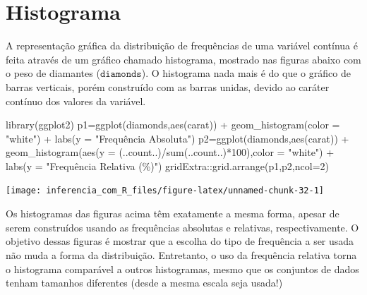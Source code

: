 \documentclass[
]{book}
\newenvironment{Shaded}{\begin{snugshade}}{\end{snugshade}}
\newcommand{\AttributeTok}[1]{\textcolor[rgb]{0.77,0.63,0.00}{#1}}
\newcommand{\DecValTok}[1]{\textcolor[rgb]{0.00,0.00,0.81}{#1}}
\newcommand{\FunctionTok}[1]{\textcolor[rgb]{0.00,0.00,0.00}{#1}}
\newcommand{\NormalTok}[1]{#1}
\newcommand{\OtherTok}[1]{\textcolor[rgb]{0.56,0.35,0.01}{#1}}
\newcommand{\SpecialCharTok}[1]{\textcolor[rgb]{0.00,0.00,0.00}{#1}}
\newcommand{\StringTok}[1]{\textcolor[rgb]{0.31,0.60,0.02}{#1}}
\begin{document}
\hypertarget{histograma}{%
\section{Histograma}\label{histograma}}

A representação gráfica da distribuição de frequências de uma variável contínua é feita através de um gráfico chamado histograma, mostrado nas figuras abaixo com o peso de diamantes (\(\texttt{diamonds}\)). O histograma nada mais é do que o gráfico de barras verticais, porém construído com as barras unidas, devido ao caráter contínuo dos valores da variável.

\begin{Shaded}
\begin{Highlighting}[]
\FunctionTok{library}\NormalTok{(ggplot2)}
\NormalTok{p1}\OtherTok{=}\FunctionTok{ggplot}\NormalTok{(diamonds,}\FunctionTok{aes}\NormalTok{(carat)) }\SpecialCharTok{+}
  \FunctionTok{geom\_histogram}\NormalTok{(}\AttributeTok{color =} \StringTok{"white"}\NormalTok{) }\SpecialCharTok{+}
  \FunctionTok{labs}\NormalTok{(}\AttributeTok{y =} \StringTok{"Frequência Absoluta"}\NormalTok{)}
\NormalTok{p2}\OtherTok{=}\FunctionTok{ggplot}\NormalTok{(diamonds,}\FunctionTok{aes}\NormalTok{(carat)) }\SpecialCharTok{+}
  \FunctionTok{geom\_histogram}\NormalTok{(}\FunctionTok{aes}\NormalTok{(}\AttributeTok{y =}\NormalTok{ (..count..)}\SpecialCharTok{/}\FunctionTok{sum}\NormalTok{(..count..)}\SpecialCharTok{*}\DecValTok{100}\NormalTok{),}\AttributeTok{color =} \StringTok{"white"}\NormalTok{) }\SpecialCharTok{+}
  \FunctionTok{labs}\NormalTok{(}\AttributeTok{y =} \StringTok{"Frequência Relativa (\%)"}\NormalTok{)}
\NormalTok{gridExtra}\SpecialCharTok{::}\FunctionTok{grid.arrange}\NormalTok{(p1,p2,}\AttributeTok{ncol=}\DecValTok{2}\NormalTok{)}
\end{Highlighting}
\end{Shaded}

\begin{center}\texttt{[image: inferencia\_com\_R\_files/figure-latex/unnamed-chunk-32-1]} \end{center}

Os histogramas das figuras acima têm exatamente a mesma forma, apesar de serem construídos usando as frequências absolutas e relativas, respectivamente. O objetivo dessas figuras é mostrar que a escolha do tipo de frequência a ser usada não muda a forma da distribuição. Entretanto, o uso da frequência relativa torna o histograma comparável a outros histogramas, mesmo que os conjuntos de dados tenham tamanhos diferentes (desde a mesma escala seja usada!)
\end{document}
